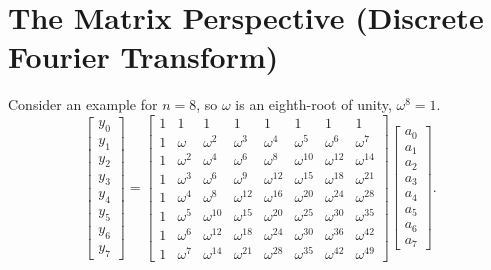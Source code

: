 \documentclass[11  pt]{article}
\begin{document}
\section{The Matrix Perspective (Discrete Fourier Transform)}
Consider an example for $n=8$, so $\omega$ is an eighth-root of unity, $\omega^8=1$. 
\begin{equation*}
    \begin{bmatrix}
        y_0 \\ y_1 \\ y_2 \\ y_3 \\ y_4 \\ y_5 \\ y_6 \\ y_7
    \end{bmatrix}
    =
    \begin{bmatrix}
        1 & 1 & 1 & 1 & 1 & 1 & 1 & 1 \\
        1 & \omega & \omega^2 & \omega^3 & \omega^4 & \omega^5 & \omega^6 & \omega^7 \\
        1 & \omega^2 & \omega^4 & \omega^6 & \omega^8 & \omega^{10} & \omega^{12} & \omega^{14} \\
        1 & \omega^3 & \omega^6 & \omega^9 & \omega^{12} & \omega^{15} & \omega^{18} & \omega^{21} \\
        1 & \omega^4 & \omega^8 & \omega^{12} & \omega^{16} & \omega^{20} & \omega^{24} & \omega^{28} \\
        1 & \omega^5 & \omega^{10} & \omega^{15} & \omega^{20} & \omega^{25} & \omega^{30} & \omega^{35} \\
        1 & \omega^6 & \omega^{12} & \omega^{18} & \omega^{24} & \omega^{30} & \omega^{36} & \omega^{42} \\
        1 & \omega^7 & \omega^{14} & \omega^{21} & \omega^{28} & \omega^{35} & \omega^{42} & \omega^{49}
    \end{bmatrix}
    \begin{bmatrix}
        a_0 \\ a_1 \\ a_2 \\ a_3 \\ a_4 \\ a_5 \\ a_6 \\ a_7
    \end{bmatrix}.
\end{equation*}

\vs{1in}
\end{document}
